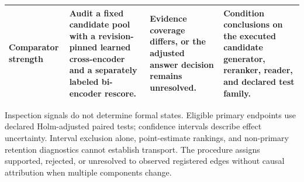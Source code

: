 \begin{table}[t]
\begin{threeparttable}
\begin{tabularx}{\textwidth}{>{\raggedright\arraybackslash}p{} >{\raggedright\arraybackslash}p{} >{\raggedright\arraybackslash}p{} >{\raggedright\arraybackslash}X}
Comparator strength & Audit a fixed candidate pool with a revision-pinned learned cross-encoder and a separately labeled bi-encoder rescore. & Evidence coverage differs, or the adjusted answer decision remains unresolved. & Condition conclusions on the executed candidate generator, reranker, reader, and declared test family. \\
\bottomrule
\end{tabularx}
\begin{tablenotes}
\footnotesize
\item Inspection signals do not determine formal states. Eligible primary endpoints use declared Holm-adjusted paired tests; confidence intervals describe effect uncertainty. Interval exclusion alone, point-estimate rankings, and non-primary retention diagnostics cannot establish transport. The procedure assigns supported, rejected, or unresolved to observed registered edges without causal attribution when multiple components change.
\end{tablenotes}
\end{threeparttable}
\end{table}
